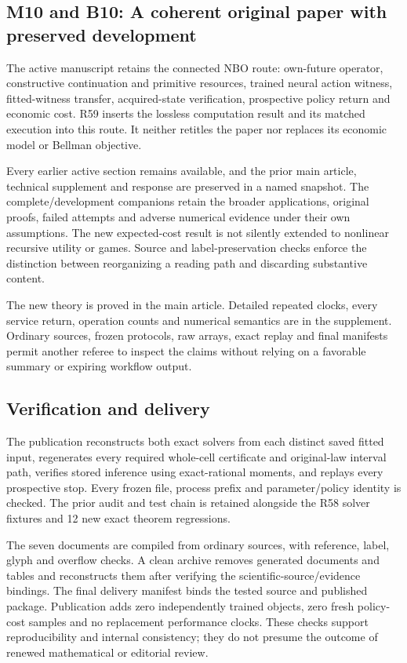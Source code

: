 \hypertarget{m10-and-b10-a-coherent-original-paper-with-preserved-development}{%
\subsection{M10 and B10: A coherent original paper with preserved
development}\label{m10-and-b10-a-coherent-original-paper-with-preserved-development}}

The active manuscript retains the connected NBO route: own-future
operator, constructive continuation and primitive resources, trained
neural action witness, fitted-witness transfer, acquired-state
verification, prospective policy return and economic cost. R59 inserts
the lossless computation result and its matched execution into this
route. It neither retitles the paper nor replaces its economic model or
Bellman objective.

Every earlier active section remains available, and the prior main
article, technical supplement and response are preserved in a named
snapshot. The complete/development companions retain the broader
applications, original proofs, failed attempts and adverse numerical
evidence under their own assumptions. The new expected-cost result is
not silently extended to nonlinear recursive utility or games. Source
and label-preservation checks enforce the distinction between
reorganizing a reading path and discarding substantive content.

The new theory is proved in the main article. Detailed repeated clocks,
every service return, operation counts and numerical semantics are in
the supplement. Ordinary sources, frozen protocols, raw arrays, exact
replay and final manifests permit another referee to inspect the claims
without relying on a favorable summary or expiring workflow output.

\hypertarget{verification-and-delivery}{%
\subsection{Verification and delivery}\label{verification-and-delivery}}

The publication reconstructs both exact solvers from each distinct saved
fitted input, regenerates every required whole-cell certificate and
original-law interval path, verifies stored inference using
exact-rational moments, and replays every prospective stop. Every frozen
file, process prefix and parameter/policy identity is checked. The prior
audit and test chain is retained alongside the R58 solver fixtures and
12 new exact theorem regressions.

The seven documents are compiled from ordinary sources, with reference,
label, glyph and overflow checks. A clean archive removes generated
documents and tables and reconstructs them after verifying the
scientific-source/evidence bindings. The final delivery manifest binds
the tested source and published package. Publication adds zero
independently trained objects, zero fresh policy-cost samples and no
replacement performance clocks. These checks support reproducibility and
internal consistency; they do not presume the outcome of renewed
mathematical or editorial review.
